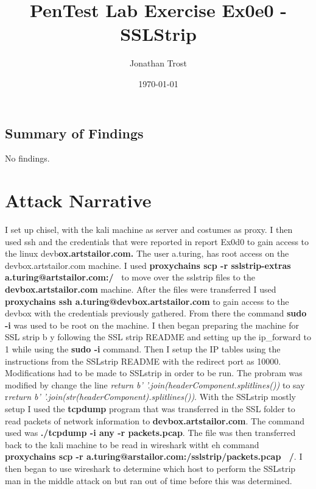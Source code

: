 \documentclass[notitlepage]{article}
\begin{document}
	
	
	\title{PenTest Lab Exercise Ex0e0 - SSLStrip}
	\author{Jonathan Trost}
	\date{\isodate\today}
	
	\maketitle
	
	\tableofcontents
	
	\newpage 
	
		\subsection{Summary of Findings}
	\indent No findings.
	
	\section{Attack Narrative}
	\indent I set up chisel, with the kali machine as server and costumes as proxy. I then used ssh and the credentials that were reported in report Ex0d0 to gain access to the linux devb\textbf{ox.artstailor.com.}  The user a.turing, has root access on the devbox.artstailor.com machine. I used \textbf{proxychains scp -r sslstrip-extras a.turing@artstailor.com:/~} to move over the sslstrip files to the \textbf{devbox.artstailor.com} machine. After the files were transferred I used \textbf{proxychains ssh a.turing@devbox.artstailor.com} to gain access to the devbox with the credentials previously gathered. From there the command \textbf{sudo -i} was used to be root on the machine.  I then began preparing the machine for SSL strip b y following the SSL strip README and setting up the ip\_forward to 1 while using the \textbf{sudo -i} command.  Then I setup the IP tables using the instructions from the SSLstrip README with the redirect port as 10000.  Modifications had to be made to SSLstrip in order to be run.  The probram was modified by change the line \textit{return b' '.join(headerComponent.splitlines())} to say r\textit{return b' '.join(str(headerComponent).splitlines())}.  
	\indent  With the SSLstrip mostly setup I used the \textbf{tcpdump} program that was transferred in the SSL folder to read packets of network information to \textbf{devbox.artstailor.com}.  The command used was \textbf{./tcpdump -i any -r packets.pcap}. The file was then transferred back to the kali machine to be read in wireshark witht eh command \textbf{proxychains scp -r a.turing@arstailor.com:/sslstrip/packets.pcap ~/}.  I then began to use wireshark to determine which host to perform the SSLstrip man in the middle attack on but ran out of time before this was determined. 
	
\end{document}
